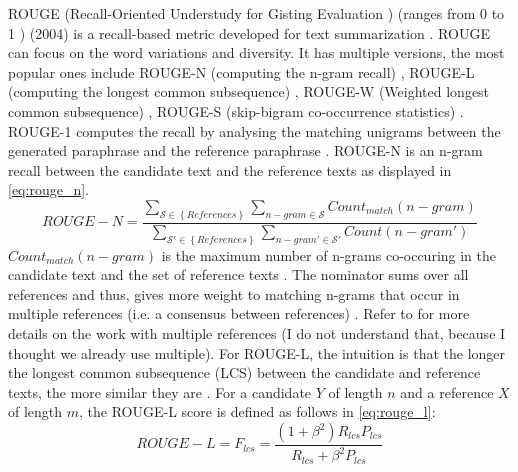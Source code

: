 ROUGE (Recall-Oriented Understudy for Gisting Evaluation \cite{palivela_optimization_2021,lin_rouge_2004}) 
(ranges from 0 to 1 \cite{kurt_pehlivanoglu_comparative_2024}) (2004) 
is a recall-based metric developed for text summarization \cite{zhou_paraphrase_2021,palivela_optimization_2021,kurt_pehlivanoglu_comparative_2024,lin_rouge_2004}.
ROUGE can focus on the word variations and diversity.
It has multiple versions, the most popular ones include 
ROUGE-N (computing the n-gram recall) \cite{zhou_paraphrase_2021,palivela_optimization_2021,kurt_pehlivanoglu_comparative_2024}, 
ROUGE-L (computing the longest common subsequence) \cite{zhou_paraphrase_2021,palivela_optimization_2021,kurt_pehlivanoglu_comparative_2024}, 
ROUGE-W (Weighted longest common subsequence) \cite{palivela_optimization_2021}, 
ROUGE-S (skip-bigram co-occurrence statistics) \cite{palivela_optimization_2021}.
ROUGE-1 computes the recall by analysing the matching unigrams between the generated paraphrase and the reference paraphrase \cite{palivela_optimization_2021,kurt_pehlivanoglu_comparative_2024}.
ROUGE-N is an n-gram recall between the candidate text and the reference texts \cite{lin_rouge_2004} as displayed in \autoref{eq:rouge_n}.
\begin{equation}
    ROUGE-N = \frac{\sum_{\mathcal{S} \in \left\{ References \right\}}\sum_{n-gram \in\mathcal{S}}Count_{match}(n-gram)}{\sum_{\mathcal{S'} \in \left\{ References \right\}}\sum_{n-gram' \in\mathcal{S'}}Count(n-gram')}
\label{eq:rouge_n}
\end{equation}
$Count_{match}(n-gram)$ is the maximum number of n-grams co-occuring in the candidate text and the set of reference texts \cite{lin_rouge_2004}.
The nominator sums over all references and thus, gives more weight to matching n-grams that occur in multiple references (i.e. a consensus between references) \cite{lin_rouge_2004}.
Refer to \citet{lin_rouge_2004} for more details on the work with multiple references (I do not understand that, because I thought we already use multiple).
For ROUGE-L, the intuition is that the longer the longest common subsequence (LCS) between the candidate and reference texts, the more similar they are \cite{lin_rouge_2004}.
For a candidate $Y$ of length $n$ and a reference $X$ of length $m$, the ROUGE-L score is defined as follows in \autoref{eq:rouge_l}:
\begin{equation}
    ROUGE-L = F_{lcs} = \frac{(1 + \beta^2)R_{lcs}P_{lcs}}{R_{lcs} + \beta^2 P_{lcs}}
\label{eq:rouge_l}
\end{equation}
